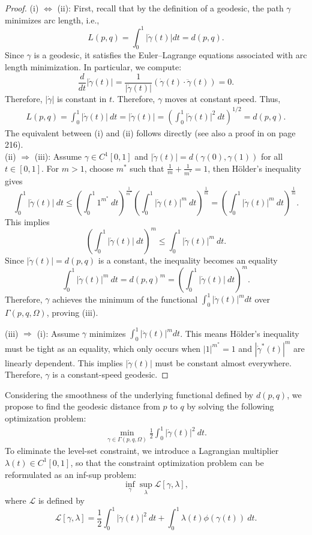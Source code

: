 \documentclass[12pt]{amsart}
\theoremstyle{definition}
\theoremstyle{remark}
\numberwithin{equation}{section}
\numberwithin{equation}{section}
\begin{document}
\begin{proof}
(i) $\Leftrightarrow$ (ii): First, recall that by the definition of a geodesic, the path $\gamma$ minimizes arc length, i.e.,
$$
L(p, q)=\int_0^1 |\dot \gamma(t)|dt =d(p, q).
$$
Since $\gamma$ is a geodesic, it satisfies the Euler–Lagrange equations associated with arc length minimization.
In particular, we compute:
    \[\frac{d}{dt}|\dot{\gamma}(t)| = \frac{1}{|\dot{\gamma}(t)|}(\dot{\gamma}(t)\cdot \ddot{\gamma}(t)) = 0.\]
    Therefore, $|\dot{\gamma}|$ is constant in $t$.
    Therefore, $\gamma$ moves at constant speed. Thus,  
\begin{align*}
    L(p,q)  = \int_0^1|\dot{\gamma}(t)|~dt = |\dot{\gamma}(t)|
    = \left(\int_0^1 |\dot{\gamma}(t)|^2~dt\right)^{1/2}
    = d(p,q).
\end{align*}
The equivalent between (i) and (ii) follows directly (see also a proof in \cite{Pressley:2001} on page 216).\\
 (ii) $\Rightarrow$ (iii): Assume $\gamma \in C^1[0, 1]$ and $|\dot \gamma(t)| = d(\gamma(0), \gamma(1))$ for all $t \in[0, 1]$. For $m>1$, choose $m^*$ such that $\frac{1}{m}+\frac{1}{m^*} = 1$, then H\"{o}lder's inequality gives 
\[\int_0^1 |\dot{\gamma}(t)|~dt \leq \left(\int_0^1 1^{m^*}~dt\right)^{\frac{1}{m^*}}\left(\int_0^1 |\dot{\gamma}(t)|^{m}~dt\right)^{\frac{1}{m}} = \left(\int_0^1 |\dot{\gamma}(t)|^{m}~dt\right)^{\frac{1}{m}}.\]
This implies 
$$
\left(\int_0^1 |\dot{\gamma}(t)|~dt\right)^m \leq \int_0^1 |\dot{\gamma}(t)|^m~dt.
$$
Since  $|\dot{\gamma}(t)| = d(p,q)$ is a constant, the inequality becomes an equality 
\[
\int_0^1 |\dot{\gamma}(t)|^m~dt = d(p,q)^m = \left(\int_0^1 |\dot{\gamma}(t)|~dt\right)^m.
\]
Therefore, $\gamma$ achieves the minimum of the functional 
$\int_0^1 |\dot \gamma(t)|^m dt$ over $\Gamma(p, q, \Omega)$, proving (iii).  

(iii) $\Rightarrow$ (i):  Assume $\gamma$ minimizes  
$\int_0^1 |\dot \gamma(t)|^m dt$. This means H\"{o}lder's inequality must be tight as an equality, which only occurs  when $|1|^{m^*} = 1$ and $|\dot{\gamma}^*(t)|^m$ are linearly dependent. This implies $|\dot\gamma(t)|$ must be constant almost everywhere. Therefore, $\gamma$ is a constant-speed geodesic. 
\end{proof}
Considering the smoothness of the underlying functional defined by $d(p, q)$, we propose to find the geodesic distance from $p$ to $q$ by solving the following optimization problem:
\begin{align*}
\min_{\gamma \in \Gamma(p, q, \Omega)}  \frac{1}{2}\int_0^1|\dot \gamma(t)|^2~dt.    
\end{align*}
To eliminate the level-set constraint, we introduce a Lagrangian multiplier $\lambda(t) \in C^1[0, 1]$, so that the constraint optimization problem can be reformulated as  an inf-sup problem:
\[\inf_{\gamma}\sup_{\lambda} \mathcal{L}[\gamma,\lambda],\]
where  $\mathcal{L}$ is defined by 
\[
\mathcal{L}[\gamma,\lambda] = \frac{1}{2}\int_0^1 |\dot{\gamma}(t)|^2~dt  + \int_0^1 \lambda(t)\phi(\gamma(t))~dt.
\]
\end{document}

